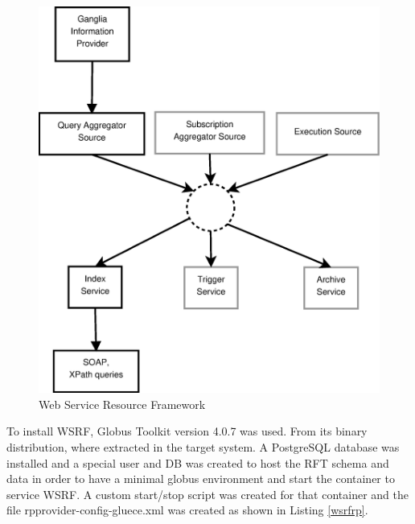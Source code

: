 \begin{figure}[htb]
\centering
 \includegraphics[width=5in]{images/wsrf.eps}
\caption{Web Service Resource Framework}
\label{figure:wsrf}
\end{figure}

To install WSRF, Globus Toolkit version 4.0.7 was used. From its binary distribution, where extracted in the target system. A PostgreSQL database was installed and a special user and DB was created to host the RFT schema and data in order to have a minimal globus environment and start the container to service WSRF. A custom start/stop script was created for that container and the file rpprovider-config-gluece.xml was created as shown in Listing \ref{wsrfrp}.

